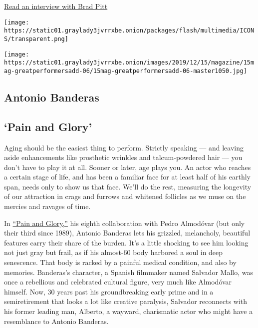 \href{https://www.nytimes3xbfgragh.onion/interactive/2019/12/09/magazine/brad-pitt-interview.html}{Read
an interview with Brad Pitt}

\texttt{[image: https://static01.graylady3jvrrxbe.onion/packages/flash/multimedia/ICONS/transparent.png]}

\texttt{[image: https://static01.graylady3jvrrxbe.onion/images/2019/12/15/magazine/15mag-greatperformersadd-06/15mag-greatperformersadd-06-master1050.jpg]}

\hypertarget{antonio-banderas}{%
\subsection{Antonio Banderas}\label{antonio-banderas}}

\hypertarget{pain-and-glory}{%
\subsection{`Pain and Glory'}\label{pain-and-glory}}

Aging should be the easiest thing to perform. Strictly speaking --- and
leaving aside enhancements like prosthetic wrinkles and talcum-powdered
hair --- you don't have to play it at all. Sooner or later, age plays
you. An actor who reaches a certain stage of life, and has been a
familiar face for at least half of his earthly span, needs only to show
us that face. We'll do the rest, measuring the longevity of our
attraction in crags and furrows and whitened follicles as we muse on the
mercies and ravages of time.

In
\href{https://www.nytimes3xbfgragh.onion/2019/10/03/movies/pain-and-glory-review.html}{``Pain
and Glory,''} his eighth collaboration with Pedro Almodóvar (but only
their third since 1989), Antonio Banderas lets his grizzled, melancholy,
beautiful features carry their share of the burden. It's a little
shocking to see him looking not just gray but frail, as if his almost-60
body harbored a soul in deep senescence. That body is racked by a
painful medical condition, and also by memories. Banderas's character, a
Spanish filmmaker named Salvador Mallo, was once a rebellious and
celebrated cultural figure, very much like Almodóvar himself. Now, 30
years past his groundbreaking early prime and in a semiretirement that
looks a lot like creative paralysis, Salvador reconnects with his former
leading man, Alberto, a wayward, charismatic actor who might have a
resemblance to Antonio Banderas.

